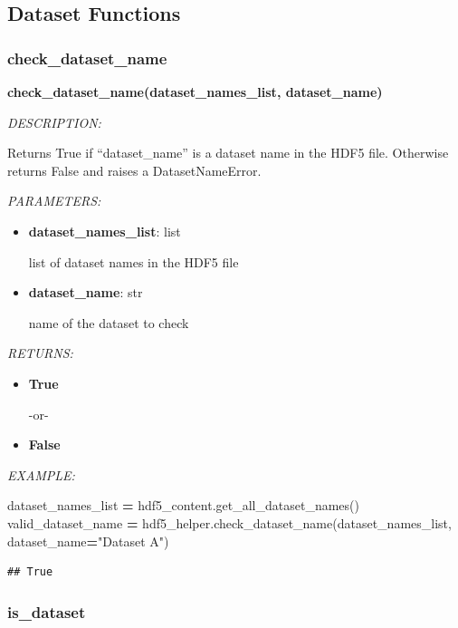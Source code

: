 \documentclass[
]{article}
\newenvironment{Shaded}{\begin{snugshade}}{\end{snugshade}}
\newcommand{\NormalTok}[1]{#1}
\newcommand{\OperatorTok}[1]{\textcolor[rgb]{0.81,0.36,0.00}{\textbf{#1}}}
\newcommand{\StringTok}[1]{\textcolor[rgb]{0.31,0.60,0.02}{#1}}
\begin{document}
\hypertarget{dataset-functions-2}{%
\subsection{Dataset Functions}\label{dataset-functions-2}}

\hypertarget{check_dataset_name}{%
\subsubsection{check\_dataset\_name}\label{check_dataset_name}}

\textbf{check\_dataset\_name(dataset\_names\_list, dataset\_name)}

\emph{DESCRIPTION:}

Returns True if ``dataset\_name'' is a dataset name in the HDF5 file. Otherwise returns False and raises a DatasetNameError.

\emph{PARAMETERS:}

\begin{itemize}
\item
  \textbf{dataset\_names\_list}: list

  list of dataset names in the HDF5 file
\item
  \textbf{dataset\_name}: str

  name of the dataset to check
\end{itemize}

\emph{RETURNS:}

\begin{itemize}
\item
  \textbf{True}

  -or-
\item
  \textbf{False}
\end{itemize}

\emph{EXAMPLE:}

\begin{Shaded}
\begin{Highlighting}[]
\NormalTok{dataset_names_list }\OperatorTok{=}\NormalTok{ hdf5_content.get_all_dataset_names()}
\NormalTok{valid_dataset_name }\OperatorTok{=}\NormalTok{ hdf5_helper.check_dataset_name(dataset_names_list, dataset_name}\OperatorTok{=}\StringTok{"Dataset A"}\NormalTok{)}
\end{Highlighting}
\end{Shaded}

\begin{verbatim}
## True
\end{verbatim}

\hypertarget{is_dataset}{%
\subsubsection{is\_dataset}\label{is_dataset}}
\end{document}
